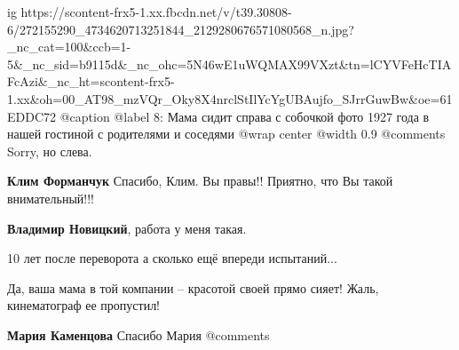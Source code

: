  
 
 
 
 

\ifcmt
  ig https://scontent-frx5-1.xx.fbcdn.net/v/t39.30808-6/272155290_4734620713251844_2129280676571080568_n.jpg?_nc_cat=100&ccb=1-5&_nc_sid=b9115d&_nc_ohc=5N46wE1uWQMAX99VXzt&tn=lCYVFeHcTIAFcAzi&_nc_ht=scontent-frx5-1.xx&oh=00_AT98_mzVQr_Oky8X4nrclStIlYcYgUBAujfo_SJrrGuwBw&oe=61EDDC72
  @caption @label 8: Мама сидит справа с собочкой фото 1927 года в нашей гостиной с родителями и соседями
	@wrap center
	@width 0.9
	@comments%
Sorry, но слева.

\textbf{Клим Форманчук} Спасибо, Клим. Вы правы!! Приятно, что Вы такой внимательный!!!

\textbf{Владимир Новицкий}, работа у меня такая.

10 лет после переворота а сколько ещё впереди испытаний...

Да, ваша мама в той компании – красотой своей прямо сияет! Жаль, кинематограф ее пропустил!

\textbf{Мария Каменцова} Спасибо Мария
	@comments%
\fi
